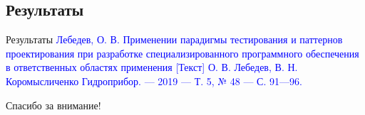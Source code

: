 \subsection{Результаты}
\begin{frame}{Результаты}
    \textcolor{blue}{\tiny Лебедев, О. В. Применении парадигмы тестирования и паттернов проектирования при разработке специализированного программного
    обеспечения в ответственных областях применения [Текст] \/ О. В. Лебедев,
    В. Н. Коромысличенко \/\/ Гидроприбор. — 2019 — Т. 5, № 48 — С. 91—96.}
    \begin{figure}[h]
        \centering
    \end{figure}
\end{frame}


\begin{frame} %
    \begin{center}
        \Huge
        Спасибо за внимание!
    \end{center}
\end{frame}
